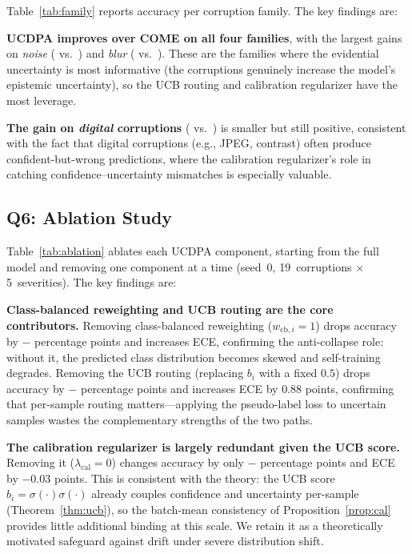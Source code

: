 

Table~\ref{tab:family} reports accuracy per corruption family. The key findings are:

\textbf{UCDPA improves over COME on all four families}, with the largest gains on \emph{noise} (\ucdpanoise{} vs.\ \comenoise{}) and \emph{blur} (\ucdpablur{} vs.\ \comeblur{}). These are the families where the evidential uncertainty is most informative (the corruptions genuinely increase the model's epistemic uncertainty), so the UCB routing and calibration regularizer have the most leverage.

\textbf{The gain on \emph{digital} corruptions} (\ucdpadigital{} vs.\ \comedigital{}) is smaller but still positive, consistent with the fact that digital corruptions (e.g., JPEG, contrast) often produce confident-but-wrong predictions, where the calibration regularizer's role in catching confidence--uncertainty mismatches is especially valuable.

\subsection{Q6: Ablation Study}
\label{sec:exp:ablation}



Table~\ref{tab:ablation} ablates each UCDPA component, starting from the full model and removing one component at a time (seed~0, 19~corruptions $\times$ 5~severities). The key findings are:

\textbf{Class-balanced reweighting and UCB routing are the core contributors.} Removing class-balanced reweighting ($w_{\mathrm{cb},i}=1$) drops accuracy by \ablationfull{} $-$ \ablationnocb{} percentage points and increases ECE, confirming the anti-collapse role: without it, the predicted class distribution becomes skewed and self-training degrades. Removing the UCB routing (replacing $b_i$ with a fixed $0.5$) drops accuracy by \ablationfull{} $-$ \ablationnoucb{} percentage points and increases ECE by $0.88$ points, confirming that per-sample routing matters---applying the pseudo-label loss to uncertain samples wastes the complementary strengths of the two paths.

\textbf{The calibration regularizer is largely redundant given the UCB score.} Removing it ($\lambda_\mathrm{cal}=0$) changes accuracy by only \ablationfull{} $-$ \ablationnocal{} percentage points and ECE by $-0.03$ points. This is consistent with the theory: the UCB score $b_i=\sigma(\cdot)\sigma(\cdot)$ already couples confidence and uncertainty per-sample (Theorem~\ref{thm:ucb}), so the batch-mean consistency of Proposition~\ref{prop:cal} provides little additional binding at this scale. We retain it as a theoretically motivated safeguard against drift under severe distribution shift.

